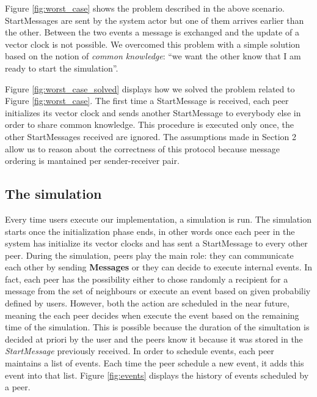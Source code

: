 \documentclass[11pt]{article}
\begin{document}


\noindent
Figure \ref{fig:worst_case} shows the problem described in the above scenario. StartMessages are sent by the system actor but one of them arrives earlier than the other. Between the two events a message is exchanged and the update of a vector clock is not possible. We overcomed this problem with a simple solution based on the notion of \textit{common knowledge}: ``we want the other know that I am ready to start the simulation''.



\noindent
Figure \ref{fig:worst_case_solved} displays how we solved the problem related to Figure \ref{fig:worst_case}. The first time a StartMessage is received, each peer initializes its vector clock and sends another StartMessage to everybody else in order to share common knowledge. This procedure is executed only once, the other StartMessages received are ignored. The assumptions made in Section 2 allow us to reason about the correctness of this protocol because message ordering is mantained per sender-receiver pair.

\subsection{The simulation}

Every time users execute our implementation, a simulation is run. The simulation starts once the initialization phase ends, in other words once each peer in the system has initialize its vector clocks and has sent a StartMessage to every other peer. During the simulation, peers play the main role: they can communicate each other by sending \textbf{Messages} or they can decide to execute internal events. In fact, each peer has the possibility either to chose randomly a recipient for a message from the set of neighbours or execute an event based on given probabiliy defined by users. However, both the action are scheduled in the near future, meaning the each peer decides when execute the event based on the remaining time of the simulation. This is possible because the duration of the simultation is decided at priori by the user and the peers know it because it was stored in the \textit{StartMessage} previously received. In order to schedule events, each peer maintains a list of events. Each time the peer schedule a new event, it adds this event into that list. Figure \ref{fig:events} displays the history of events scheduled by a peer.
\end{document}
